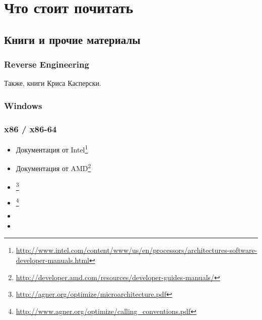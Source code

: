 \chapter{Что стоит почитать}

\section{Книги и прочие материалы}

\subsection{Reverse Engineering}

Также, книги Криса Касперски.



\subsection{Windows}



\subsection{\CCpp}



\subsection{x86 / x86-64}

\label{x86_manuals}
\begin{itemize}
\item Документация от Intel\footnote{\AlsoAvailableAs \url{http://www.intel.com/content/www/us/en/processors/architectures-software-developer-manuals.html}}

\item Документация от AMD\footnote{\AlsoAvailableAs \url{http://developer.amd.com/resources/developer-guides-manuals/}}

\item \AgnerFog{}\footnote{\AlsoAvailableAs \url{http://agner.org/optimize/microarchitecture.pdf}}

\item \AgnerFogCC{}\footnote{\AlsoAvailableAs \url{http://www.agner.org/optimize/calling_conventions.pdf}}

\item \IntelOptimization

\item \AMDOptimization
\end{itemize}

